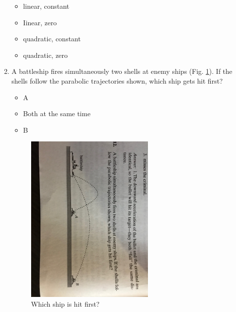 \documentclass[10pt]{article}
\begin{document}
\begin{enumerate}
\begin{itemize}
\item linear, constant
\item Iinear, zero
\item quadratic, constant
\item quadratic, zero
\end{itemize}
\item A battleship fires simultaneously two shells at enemy ships (Fig. \ref{fig:battle}).  If the shells follow the parabolic trajectories shown, which ship gets hit first?
\begin{itemize}
\item A
\item Both at the same time
\item B
\end{itemize}
\begin{figure}[hb]
\centering
\includegraphics[width=0.6\textwidth,trim=0cm 30cm 0cm 45cm,clip=true]{battle.jpeg}
\caption{\label{fig:battle} Which ship is hit first?}
\end{figure}
\end{enumerate}
\end{document}
